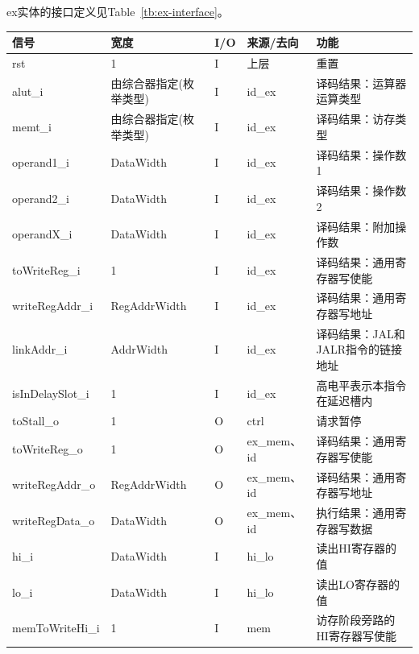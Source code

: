 \documentclass{article}
\begin{document}
\begin{spacing}{1.4}
ex实体的接口定义见Table~\ref{tb:ex-interface}。
\begin{longtable}{l|l|l|l|p{5cm}}
\hline
\textbf{信号}&\textbf{宽度}&\textbf{I/O}&\textbf{来源/去向}&\textbf{功能} \\
\hline \endhead rst            & 1                      & I     & 上层          & 重置 \\
\hline alut\_i                 & 由综合器指定(枚举类型) & I     & id\_ex        & 译码结果：运算器运算类型 \\
\hline memt\_i                 & 由综合器指定(枚举类型) & I     & id\_ex        & 译码结果：访存类型 \\
\hline operand1\_i             & DataWidth              & I     & id\_ex        & 译码结果：操作数1 \\
\hline operand2\_i             & DataWidth              & I     & id\_ex        & 译码结果：操作数2 \\
\hline operandX\_i             & DataWidth              & I     & id\_ex        & 译码结果：附加操作数 \\
\hline toWriteReg\_i           & 1                      & I     & id\_ex        & 译码结果：通用寄存器写使能 \\
\hline writeRegAddr\_i         & RegAddrWidth           & I     & id\_ex        & 译码结果：通用寄存器写地址 \\
\hline linkAddr\_i             & AddrWidth              & I     & id\_ex        & 译码结果：JAL和JALR指令的链接地址 \\
\hline isInDelaySlot\_i        & 1                      & I     & id\_ex        & 高电平表示本指令在延迟槽内 \\
\hline toStall\_o              & 1                      & O     & ctrl          & 请求暂停 \\
\hline toWriteReg\_o           & 1                      & O     & ex\_mem、id   & 译码结果：通用寄存器写使能 \\
\hline writeRegAddr\_o         & RegAddrWidth           & O     & ex\_mem、id   & 译码结果：通用寄存器写地址 \\
\hline writeRegData\_o         & DataWidth              & O     & ex\_mem、id   & 执行结果：通用寄存器写数据 \\
\hline hi\_i                   & DataWidth              & I     & hi\_lo        & 读出HI寄存器的值 \\
\hline lo\_i                   & DataWidth              & I     & hi\_lo        & 读出LO寄存器的值 \\
\hline memToWriteHi\_i         & 1                      & I     & mem           & 访存阶段旁路的HI寄存器写使能 \\

\end{longtable}
\end{spacing}
\end{document}
